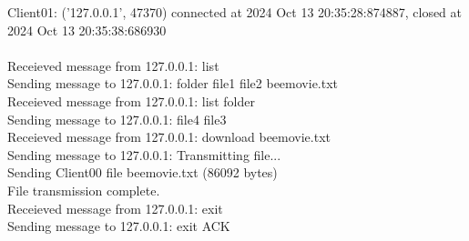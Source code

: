 \documentclass{article}
\begin{document}
{Client01: ('127.0.0.1', 47370) connected at 2024 Oct 13 20:35:28:874887, closed at 2024 Oct 13 20:35:38:686930\\
\\
Receieved message from 127.0.0.1: list\\
Sending message to 127.0.0.1: folder file1 file2 beemovie.txt\\
Receieved message from 127.0.0.1: list folder\\
Sending message to 127.0.0.1: file4 file3\\
Receieved message from 127.0.0.1: download beemovie.txt\\
Sending message to 127.0.0.1: Transmitting file...\\
Sending Client00 file beemovie.txt (86092 bytes)\\
File transmission complete.\\
Receieved message from 127.0.0.1: exit\\
Sending message to 127.0.0.1: exit ACK}
\end{document}
